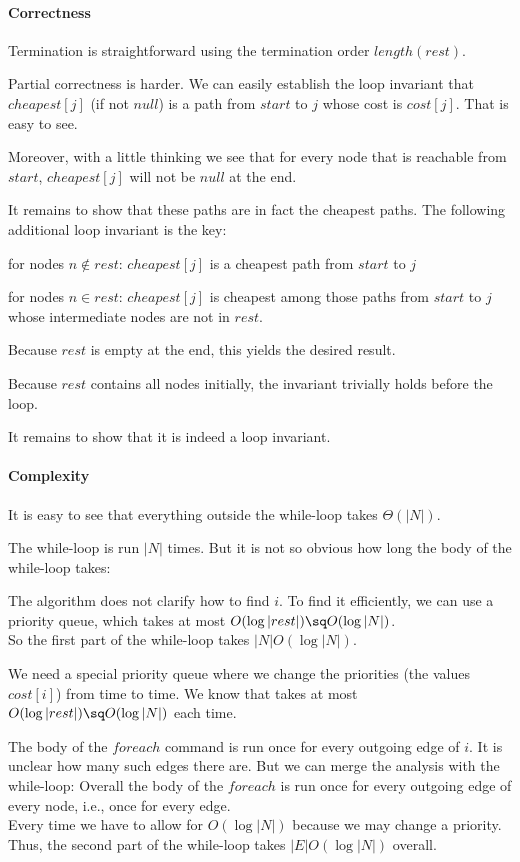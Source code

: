 \paragraph{Correctness}
Termination is straightforward using the termination order $length(rest)$.
\medskip

Partial correctness is harder.
We can easily establish the loop invariant that $cheapest[j]$ (if not $null$) is a path from $start$ to $j$ whose cost is $cost[j]$.
That is easy to see.

Moreover, with a little thinking we see that for every node that is reachable from $start$, $cheapest[j]$ will not be $null$ at the end.

It remains to show that these paths are in fact the cheapest paths.
The following additional loop invariant is the key:
\begin{compactitem}
 \item for nodes $n\nin rest$: $cheapest[j]$ is a cheapest path from $start$ to $j$
 \item for nodes $n\in rest$: $cheapest[j]$ is cheapest among those paths from $start$ to $j$ whose intermediate nodes are not in $rest$.
\end{compactitem} 
Because $rest$ is empty at the end, this yields the desired result.

Because $rest$ contains all nodes initially, the invariant trivially holds before the loop.

It remains to show that it is indeed a loop invariant.

\paragraph{Complexity}
It is easy to see that everything outside the while-loop takes $\Theta(|N|)$.

The while-loop is run $|N|$ times.
But it is not so obvious how long the body of the while-loop takes:
\begin{compactitem}
 \item The algorithm does not clarify how to find $i$. To find it efficiently, we can use a priority queue, which takes at most $O(\log|rest|)\sq O(\log|N|)$.\\
 So the first part of the while-loop takes $|N|O(\log|N|)$.
 \item We need a special priority queue where we change the priorities (the values $cost[i]$) from time to time.
  We know that takes at most $O(\log |rest|)\sq O(\log|N|)$ each time.
 \item The body of the $foreach$ command is run once for every outgoing edge of $i$.
 It is unclear how many such edges there are.
 But we can merge the analysis with the while-loop: Overall the body of the $foreach$ is run once for every outgoing edge of every node, i.e., once for every edge.\\
 Every time we have to allow for $O(\log|N|)$ because we may change a priority.\\
 Thus, the second part of the while-loop takes $|E|O(\log|N|)$ overall.
\end{compactitem}


